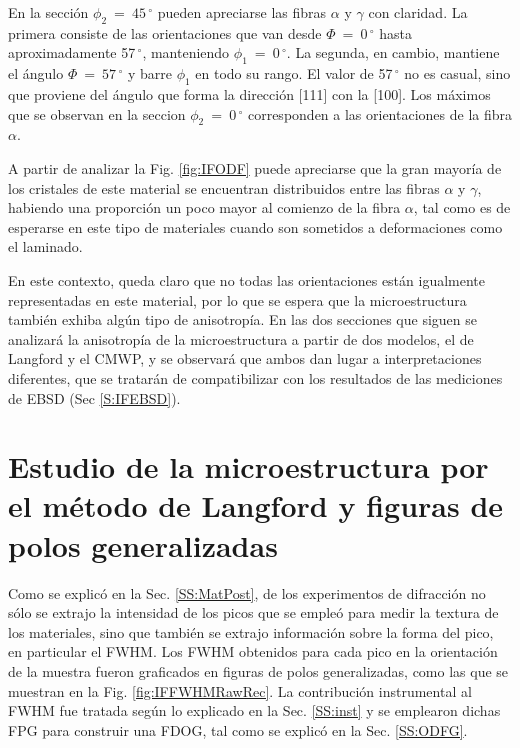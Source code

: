 En la sección $\phi_2 \ = \ 45$\,$^{\circ}$ pueden apreciarse las fibras $\alpha$ y $\gamma$ con claridad. 
La primera consiste de las orientaciones que van desde $\Phi \ = \ 0$\,$^{\circ}$ hasta aproximadamente 57\,$^{\circ}$, manteniendo $\phi_1 \ = \ 0$\,$^{\circ}$.
La segunda, en cambio, mantiene el ángulo $\Phi \ = \ 57$\,$^{\circ}$ y barre $\phi_1$ en todo su rango. El valor de 57\,$^{\circ}$ no es casual, sino que proviene del ángulo que forma la dirección [111] con la [100].
Los máximos que se observan en la seccion $\phi_2 \ = \ 0$\,$^{\circ}$ corresponden a las orientaciones de la fibra $\alpha$.

A partir de analizar la Fig. \ref{fig:IFODF} puede apreciarse que la gran mayoría de los cristales de este material se encuentran distribuidos entre las fibras $\alpha$ y $\gamma$, habiendo una proporción un poco mayor al comienzo de la fibra $\alpha$, tal como es de esperarse en este tipo de materiales cuando son sometidos a deformaciones como el laminado.

En este contexto, queda claro que no todas las orientaciones están igualmente representadas en este material, por lo que se espera que la microestructura también exhiba algún tipo de anisotropía.
En las dos secciones que siguen se analizará la anisotropía de la microestructura a partir de dos modelos, el de Langford y el CMWP, y se observará que ambos dan lugar a interpretaciones diferentes, que se tratarán de compatibilizar con los resultados de las mediciones de EBSD (Sec \ref{S:IFEBSD}).

\section{Estudio de la microestructura por el método de Langford y figuras de polos generalizadas}\label{S:IFLANG}
Como se explicó en la Sec. \ref{SS:MatPost}, de los experimentos de difracción no sólo se extrajo la intensidad de los picos que se empleó para medir la textura de los materiales, sino que también se extrajo información sobre la forma del pico, en particular el FWHM.
Los FWHM obtenidos para cada pico en la orientación de la muestra fueron graficados en figuras de polos generalizadas, como las que se muestran en la Fig. \ref{fig:IFFWHMRawRec}.
La contribución instrumental al FWHM fue tratada según lo explicado en la Sec. \ref{SS:inst} y se emplearon dichas FPG para construir una FDOG, tal como se explicó en la Sec. \ref{SS:ODFG}.

